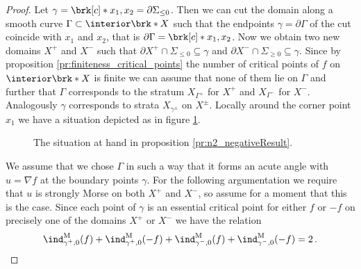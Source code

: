\begin{proof}
  Let $\gamma=\brk[c]*{x_1,x_2}=\partial\Sigma_{\leq0}$.
  Then we can cut the domain along a smooth curve $\Gamma\subset\interior\brk*{X}$ such that the endpoints $\gamma=\partial\Gamma$
  of the cut coincide with $x_1$ and $x_2$, that is $\partial\Gamma=\brk[c]*{x_1,x_2}$.
  Now we obtain two new domains $X^+$ and $X^-$ such that $\partial X^+\cap\Sigma_{\leq0}\subseteq\gamma$ and
  $\partial X^-\cap\Sigma_{\geq0}\subseteq\gamma$.
  Since by proposition \ref{pr:finiteness_critical_points} the number of critical points of $f$ on $\interior\brk*{X}$ is finite we can assume that none of them lie on $\Gamma$ and further that $\Gamma$ corresponds to the stratum 
  $X_{\Gamma^+}$ for $X^+$ and $X_{\Gamma^-}$ for $X^-$.
  Analogously $\gamma$ corresponds to strata $X_{\gamma^\pm}$ on $X^\pm$.
  Locally around the corner point $x_1$ we have a situation depicted as in figure \ref{fi:n2_cutOmega_flowthrough}.
  \begin{figure} 
    \centering
    
    \caption{The situation at hand in proposition \ref{pr:n2_negativeResult}.}
    \label{fi:n2_cutOmega_flowthrough}
  \end{figure}
  We assume that we chose $\Gamma$ in such a way that it forms an acute angle with $u=\nabla f$ at the boundary points $\gamma$.
  For the following argumentation we require that $u$ is strongly Morse on both $X^+$ and $X^-$, so assume for a moment that this
  is the case.
  Since each point of $\gamma$ is an essential critical point for either $f$ or $-f$ on precisely one of the domains $X^+$ or $X^-$ we have
  the relation
  \begin{align}
    \ind^\text{M}_{\gamma^+,0}(f)+\ind^\text{M}_{\gamma^+,0}(-f)+\ind^\text{M}_{\gamma^-,0}(f)+\ind^\text{M}_{\gamma^-,0}(-f)=2\,.\label{eq:n2_disproof_morse_relgamma}

\end{align}
\end{proof}
